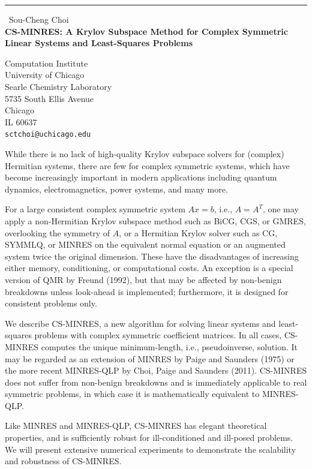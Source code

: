 \documentclass{report}
\begin{document}
\begin{center}
\rule{6in}{1pt} \
{\large Sou-Cheng Choi \\
{\bf CS-MINRES: A Krylov Subspace Method for Complex Symmetric Linear Systems and Least-Squares Problems}}

Computation Institute \\ University of Chicago \\ Searle Chemistry Laboratory \\ 5735 South Ellis Avenue \\ Chicago \\ IL 60637
\\
{\tt sctchoi@uchicago.edu}\end{center}

While there is no lack of high-quality Krylov subspace solvers for
(complex) Hermitian systems, there are few for complex symmetric systems,
which have become increasingly important in modern applications including
quantum dynamics, electromagnetics, power systems, and many more.

For a large consistent complex symmetric system $Ax=b$, i.e., $A=A^T$,
one may apply a non-Hermitian Krylov subspace method such as BiCG, CGS,
or GMRES, overlooking the symmetry of $A$, or a Hermitian Krylov solver
such as CG, SYMMLQ, or MINRES on the equivalent normal equation or an
augmented system twice the original dimension. These have the
disadvantages of increasing either memory, conditioning, or computational
costs. An exception is a special version of QMR by Freund (1992), but
that may be affected by non-benign breakdowns unless look-ahead is
implemented; furthermore, it is designed for consistent problems only.

We describe CS-MINRES, a new algorithm for solving linear systems and
least-squares problems with complex symmetric coefficient matrices. In
all cases, CS-MINRES computes the unique minimum-length, i.e.,
pseudoinverse, solution. It may be regarded as an extension of MINRES by
Paige and Saunders (1975) or the more recent MINRES-QLP by Choi, Paige
and Saunders (2011). CS-MINRES does not suffer from non-benign breakdowns
and is immediately applicable to real symmetric problems, in which case
it is mathematically equivalent to MINRES-QLP.

Like MINRES and MINRES-QLP, CS-MINRES has elegant theoretical properties,
and is sufficiently robust for ill-conditioned and ill-posed problems. We
will present extensive numerical experiments to demonstrate the
scalability and robustness of CS-MINRES.
\end{document}

